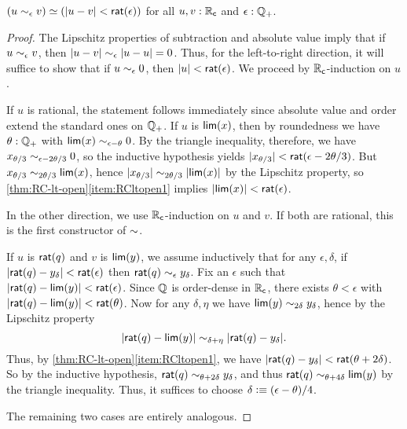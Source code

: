 \begin{thm} \label{RC-sim-eqv-le}
  $(u \sim_{\epsilon} v) \simeq (|u - v| < \mathsf{rat}(\epsilon))$
  for all $u, v : \mathbb{R}_\mathsf{c}$ and $\epsilon : \mathbb{Q}_{+}$.
\end{thm}
\begin{proof}
  The Lipschitz properties of subtraction and absolute value imply that if $u\sim_{\epsilon} v$, then $|u-v| \sim_{\epsilon} |u-u| = 0$.
  Thus, for the left-to-right direction, it will suffice to show that if $u\sim_{\epsilon} 0$, then $|u|<\mathsf{rat}(\epsilon)$.
  We proceed by $\mathbb{R}_\mathsf{c}$-induction on $u$.

  If $u$ is rational, the statement follows immediately since absolute value and order extend the standard ones on $\mathbb{Q}_{+}$.
  If $u$ is $\mathsf{lim}(x)$, then by roundedness we have $\theta:\mathbb{Q}_{+}$ with $\mathsf{lim}(x)\sim_{\epsilon-\theta} 0$.
  By the triangle inequality, therefore, we have $x_{\theta/3} \sim_{\epsilon-2\theta/3} 0$, so the inductive hypothesis yields $|x_{\theta/3}|<\mathsf{rat}(\epsilon-2\theta/3)$.
  But $x_{\theta/3} \sim_{2\theta/3} \mathsf{lim}(x)$, hence $|x_{\theta/3}| \sim_{2\theta/3} |\mathsf{lim}(x)|$ by the Lipschitz property, so \autoref{thm:RC-lt-open}\ref{item:RCltopen1} implies $|\mathsf{lim}(x)|<\mathsf{rat}(\epsilon)$.

  In the other direction, we use $\mathbb{R}_\mathsf{c}$-induction on $u$ and $v$.
  If both are rational, this is the first constructor of $\mathord\sim$.

  If $u$ is $\mathsf{rat}(q)$ and $v$ is $\mathsf{lim}(y)$, we assume inductively that for any $\epsilon,\delta$, if $|\mathsf{rat}(q)-y_\delta|<\mathsf{rat}(\epsilon)$ then $\mathsf{rat}(q) \sim_{\epsilon} y_\delta$.
  Fix an $\epsilon$ such that $|\mathsf{rat}(q) - \mathsf{lim}(y)|<\mathsf{rat}(\epsilon)$.
  Since $\mathbb{Q}$ is order-dense in $\mathbb{R}_\mathsf{c}$, there exists $\theta<\epsilon$ with $|\mathsf{rat}(q) - \mathsf{lim}(y)|<\mathsf{rat}(\theta)$.
  Now for any $\delta,\eta$ we have $\mathsf{lim}(y)\sim_{2\delta} y_\delta$, hence by the Lipschitz property
  \[ |\mathsf{rat}(q) - \mathsf{lim}(y)| \sim_{\delta+\eta} |\mathsf{rat}(q) - y_\delta|. \]
  Thus, by \autoref{thm:RC-lt-open}\ref{item:RCltopen1}, we have $|\mathsf{rat}(q) - y_\delta| < \mathsf{rat}(\theta+2\delta)$.
  So by the inductive hypothesis, $\mathsf{rat}(q) \sim_{\theta+2\delta} y_\delta$, and thus $\mathsf{rat}(q)\sim_{\theta+4\delta} \mathsf{lim}(y)$ by the triangle inequality.
  Thus, it suffices to choose $\delta \vcentcolon\equiv (\epsilon-\theta)/4$.

  The remaining two cases are entirely analogous.
\end{proof}

